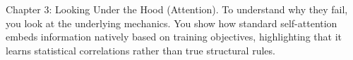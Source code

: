 Chapter 3: Looking Under the Hood (Attention). To understand why they fail, you look at the underlying mechanics. You show how standard self-attention embeds information natively based on training objectives, highlighting that it learns statistical correlations rather than true structural rules.
